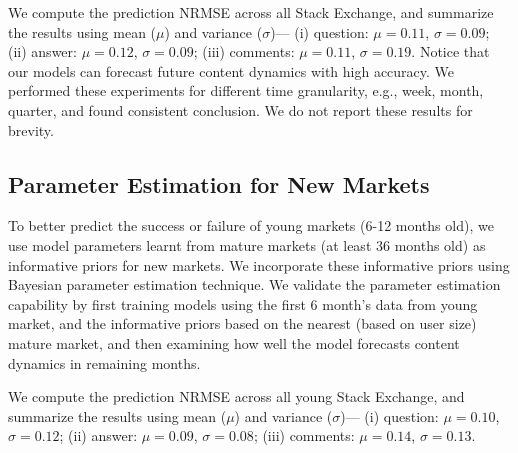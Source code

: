 We compute the prediction NRMSE across all Stack Exchange, and summarize the results using mean ($\mu$) and variance ($\sigma$)--- (i) question: $\mu = 0.11$, $\sigma = 0.09$; (ii) answer: $\mu = 0.12$, $\sigma = 0.09$; (iii) comments: $\mu = 0.11$, $\sigma = 0.19$. Notice that our models can forecast future content dynamics with high accuracy. We performed these experiments for different time granularity, e.g., week, month, quarter, and found consistent conclusion. We do not report these results for brevity.

\subsection{Parameter Estimation for New Markets} 
To better predict the success or failure of young markets (6-12 months old), we use model parameters learnt from mature markets (at least 36 months old) as informative priors for new markets. We incorporate these informative priors using Bayesian parameter estimation technique. We validate the parameter estimation capability by first training models using the first 6 month's data from young market, and the informative priors based on the nearest (based on user size) mature market, and then examining how well the model forecasts content dynamics in remaining months. 

We compute the prediction NRMSE across all young Stack Exchange, and summarize the results using mean ($\mu$) and variance ($\sigma$)--- (i) question: $\mu = 0.10$, $\sigma = 0.12$; (ii) answer: $\mu = 0.09$, $\sigma = 0.08$; (iii) comments: $\mu = 0.14$, $\sigma = 0.13$.

